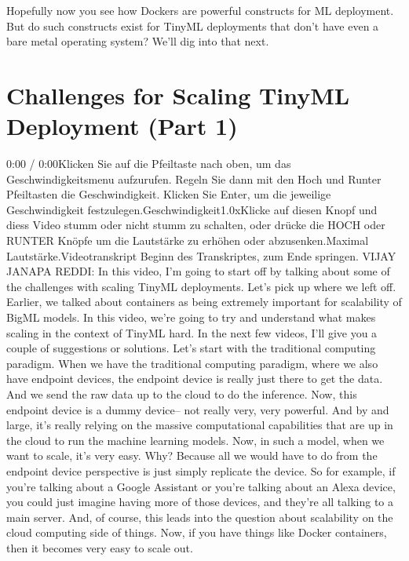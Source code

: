 {{{{{    Hopefully now you see how Dockers are powerful constructs for ML deployment. But do such constructs exist for TinyML deployments that don’t have even a bare metal operating system? We’ll dig into that next.
    
\section{Challenges for Scaling TinyML Deployment (Part 1)}

    0:00 / 0:00Klicken Sie auf die Pfeiltaste nach oben, um das Geschwindigkeitsmenu aufzurufen. Regeln Sie dann mit den Hoch und Runter Pfeiltasten die Geschwindigkeit. Klicken Sie Enter, um die jeweilige Geschwindigkeit festzulegen.Geschwindigkeit1.0xKlicke auf diesen Knopf und diess Video stumm oder nicht stumm zu schalten, oder drücke die HOCH oder RUNTER Knöpfe um die Lautstärke zu erhöhen oder abzusenken.Maximal Lautstärke.Videotranskript
    Beginn des Transkriptes, zum Ende springen.
    VIJAY JANAPA REDDI: In this video, I'm going
    to start off by talking about some of the challenges
    with scaling TinyML deployments.
    Let's pick up where we left off.
    Earlier, we talked about containers as being extremely important
    for scalability of BigML models.
    In this video, we're going to try and understand
    what makes scaling in the context of TinyML hard.
    In the next few videos, I'll give you a couple of suggestions or solutions.
    Let's start with the traditional computing paradigm.
    When we have the traditional computing paradigm,
    where we also have endpoint devices, the endpoint device
    is really just there to get the data.
    And we send the raw data up to the cloud to do the inference.
    Now, this endpoint device is a dummy device--
    not really very, very powerful.
    And by and large, it's really relying on the massive computational capabilities
    that are up in the cloud to run the machine learning models.
    Now, in such a model, when we want to scale, it's very easy.
    Why?
    Because all we would have to do from the endpoint device perspective
    is just simply replicate the device.
    So for example, if you're talking about a Google Assistant
    or you're talking about an Alexa device, you could just
    imagine having more of those devices, and they're all
    talking to a main server.
    And, of course, this leads into the question about scalability
    on the cloud computing side of things.
    Now, if you have things like Docker containers,
    then it becomes very easy to scale out.
}}}}}
